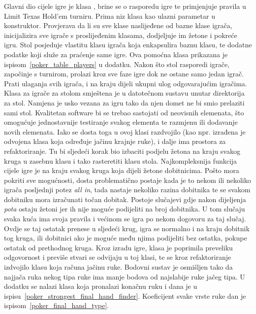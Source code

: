 Glavni dio cijele igre je klasa , brine se o rasporedu igre te primjenjuje pravila u Limit Texas Hold'em turniru. Prima niz klasa kao ulazni parametar u konstruktor. Provjerava da li su sve klase naslijeđene od bazne klase igrača, inicijalizira sve igrače s proslijeđenim klasama, dodjeljuje im žetone i pokreće igru. Stol posjeduje vlastitu klasu igrača koja enkapsulira baznu klasu, te dodatne podatke koji služe za praćenje same igre. Ova pomoćna klasa prikazana je ispisom~\ref{poker_table_players} u dodatku. Nakon što stol rasporedi igrače, započinje s turnirom, prolazi kroz sve faze igre dok ne ostane samo jedan igrač. Prati ulaganja svih igrača, i na kraju dijeli ukupni ulog odgovarajućim igračima. Klasa za igrače za stolom smještena je u datotečnom sustavu unutar direktorija za stol. Namjena je usko vezana za igru tako da njen domet ne bi smio prelaziti sami stol. Kvalitetan software bi se trebao sastojati od neovisnih elemenata, što omogućuje jednostavnije testiranje svakog elementa te razmjenu ili dodavanje novih elemenata. Iako se dosta toga u ovoj klasi razdvojilo (kao npr. izrađena je odvojena klasa koja određuje jačinu krajnje ruke), i dalje ima prostora za refaktoriranje. Tu bi sljedeći korak bio izbaciti podjelu žetona na kraju svakog kruga u zasebnu klasu i tako rasteretiti klasu stola. Najkompleksnija funkcija cijele igre je na kraju svakog kruga koja dijeli žetone dobitnicima. Pošto mora pokriti sve mogućnosti, dosta problematično postaje kada je to nekom ili nekoliko igrača posljednji potez \emph{all in}, tada nastaje nekoliko razina dobitnika te se svakom dobitniku mora izračunati točan dobitak. Postoje slučajevi gdje nakon dijeljenja \emph{pota} ostaju žetoni jer ih nije moguće podijeliti na broj dobitnika. U tom slučaju svaka kuća ima svoja pravila i većinom se igra po nekom dogovoru za taj slučaj. Ovdje se taj ostatak prenese u sljedeći krug, igra se normalno i na kraju dobitnik tog kruga, ili dobitnici ako je moguće među njima podijeliti bez ostatka, pokupe ostatak od prethodnog kruga. Kroz izradu igre, klasa  je poprimila preveliku odgovornost i previše stvari se odvijaju u toj klasi, te se kroz refaktoriranje izdvojilo klasu koja računa jačinu ruke. Bodovni sustav je osmišljen tako da najjača ruka nekog tipa ruke ima manje bodova od najslabije ruke jačeg tipa. U dodatku se nalazi klasa koja pronalazi konačnu ruku i dana je u ispisu~\ref{poker_strongest_final_hand_finder}. Koeficijent svake vrste ruke dan je ispisom~\ref{poker_final_hand_type}.


